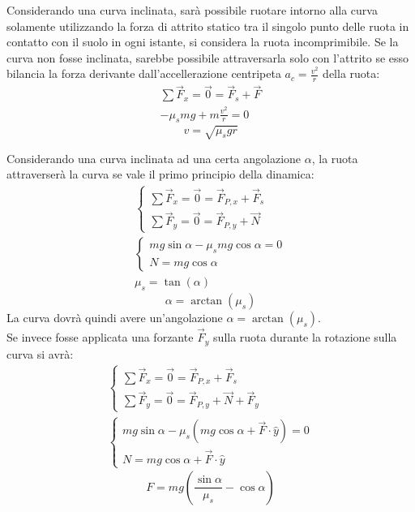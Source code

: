 \documentclass{article}
\numberwithin{equation}{subsection}
\begin{document}
Considerando una curva inclinata, sarà possibile ruotare intorno alla curva solamente utilizzando la forza di attrito statico tra il singolo punto delle ruota 
in contatto con il suolo in ogni istante, si considera la ruota incomprimibile. Se la curva non fosse inclinata, sarebbe possibile attraversarla 
solo con l'attrito se esso bilancia la forza derivante dall'accellerazione centripeta $a_c=\displaystyle\frac{v^2}{r}$ della ruota:
\begin{gather*}
    \sum\vec{F}_x=\vec{0}=\vec{F}_s+\vec{F}\\
    -\mu_smg+m\displaystyle\frac{v^2}{r}=0
\end{gather*}
\begin{equation}
    v=\sqrt{\mu_sgr}
\end{equation}

Considerando una curva inclinata ad una certa angolazione $\alpha$, la ruota attraverserà la curva se vale il primo principio della dinamica:
\begin{gather*}
    \begin{cases}
        \sum\vec{F}_x=\vec{0}=\vec{F}_{P,x}+\vec{F}_s\\
        \sum\vec{F}_y=\vec{0}=\vec{F}_{P,y}+\vec{N}
    \end{cases}\\
    \begin{cases}
        mg\sin\alpha-\mu_smg\cos\alpha=0\\
        N=mg\cos\alpha
    \end{cases}\\
    \mu_s=\tan(\alpha)
\end{gather*}
\begin{equation}
    \alpha=\arctan(\mu_s)
\end{equation}
La curva dovrà quindi avere un'angolazione $\alpha=\arctan(\mu_s)$. \\
Se invece fosse applicata una forzante $\vec{F}_y$ sulla ruota durante la rotazione sulla curva si avrà:
\begin{gather*}
    \begin{cases}
        \sum\vec{F}_x=\vec{0}=\vec{F}_{P,x}+\vec{F}_s\\
        \sum\vec{F}_y=\vec{0}=\vec{F}_{P,y}+\vec{N}+\vec{F}_y
    \end{cases}\\
    \begin{cases}
        mg\sin\alpha-\mu_s(mg\cos\alpha+\vec{F}\cdot\hat{y})=0\\
        N=mg\cos\alpha+\vec{F}\cdot\hat{y}
    \end{cases}
\end{gather*}
\begin{equation}
    F=mg\left(\displaystyle\frac{\sin\alpha}{\mu_s}-\cos\alpha\right)
\end{equation}
\end{document}
